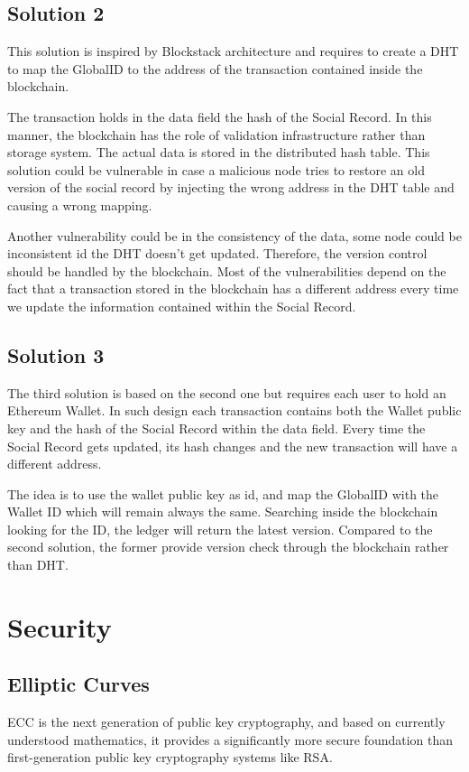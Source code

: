 \subsection{Solution 2}
This solution is inspired by Blockstack architecture and requires to create a DHT to map the GlobalID to the address of the transaction contained inside the blockchain. 

The transaction holds in the data field the hash of the Social Record. In this manner, the blockchain has the role of validation infrastructure rather than storage system. The actual data is stored in the distributed hash table. This solution could be vulnerable in case a malicious node tries to restore an old version of the social record by injecting the wrong address in the DHT table and causing a wrong mapping. 

Another vulnerability could be in the consistency of the data, some node could be inconsistent id the DHT doesn’t get updated. Therefore, the version control should be handled by the blockchain. Most of the vulnerabilities depend on the fact that a transaction stored in the blockchain has a different address every time we update the information contained within the Social Record. 

\subsection{Solution 3}
The third solution is based on the second one but requires each user to hold an Ethereum Wallet. In such design each transaction contains both the Wallet public key and the hash of the Social Record within the data field. Every time the Social Record gets updated, its hash changes and the new transaction will have a different address. 

The idea is to use the wallet public key as id, and map the GlobalID with the Wallet ID which will remain always the same. Searching inside the blockchain looking for the ID, the ledger will return the latest version. Compared to the second solution, the former provide version check through the blockchain rather than DHT. 

\section{Security}
\subsection{Elliptic Curves}
ECC is the next generation of public key cryptography, and based on currently understood mathematics, it provides a significantly more secure foundation than first-generation public key cryptography systems like RSA. 

